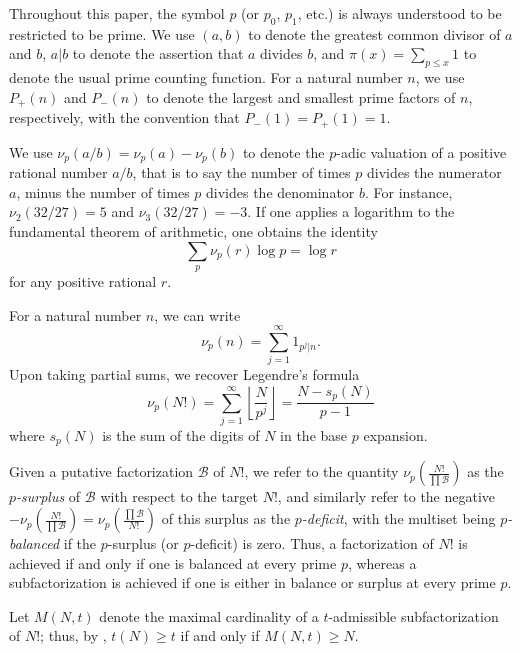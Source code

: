 \documentclass[12pt,a4paper,reqno]{amsart}
\numberwithin{equation}{section}
\theoremstyle{plain}
\theoremstyle{definition}
\newcommand\tuple{{\mathcal B}}
\begin{document}
Throughout this paper, the symbol $p$ (or $p_0$, $p_1$, etc.) is always understood to be restricted to be prime.  
We use $(a,b)$ to denote the greatest common divisor of $a$ and $b$, $a|b$ to denote the assertion that $a$ divides $b$, and $\pi(x) = \sum_{p \leq x} 1$ to denote the usual prime counting function.  For a natural number $n$, we use $P_+(n)$ and $P_-(n)$ to denote the largest and smallest prime factors of $n$, respectively, with the convention that $P_-(1) = P_+(1) = 1$. 

We use $\nu_p(a/b) = \nu_p(a)-\nu_p(b)$ to denote the $p$-adic valuation of a positive rational number $a/b$, that is to say the number of times $p$ divides the numerator $a$, minus the number of times $p$ divides the denominator $b$.  For instance, $\nu_2(32/27)=5$ and $\nu_3(32/27)=-3$.
If one applies a logarithm to the fundamental theorem of arithmetic, one obtains the identity
\begin{equation}\label{ftoa}
  \sum_p \nu_p(r) \log p = \log r
\end{equation}
for any positive rational $r$.  

For a natural number $n$, we can write
\begin{equation}\label{nup-form} 
  \nu_p(n) = \sum_{j=1}^\infty 1_{p^j|n}.
\end{equation}
Upon taking partial sums, we recover Legendre's formula
\begin{equation}\label{legendre}
  \nu_p(N!) = \sum_{j=1}^\infty \left\lfloor \frac{N}{p^j} \right\rfloor = \frac{N - s_p(N)}{p-1}
\end{equation}
where $s_p(N)$ is the sum of the digits of $N$ in the base $p$ expansion.

Given a putative factorization $\tuple$ of $N!$,  
we refer to the quantity $\nu_p\left( \frac{N!}{\prod \tuple} \right)$ as the \emph{$p$-surplus} of $\tuple$ with respect to the target $N!$, and similarly refer to the negative $-\nu_p\left( \frac{N!}{\prod \tuple} \right) = \nu_p\left( \frac{\prod \tuple}{N!} \right)$ of this surplus as the \emph{$p$-deficit}, with the multiset being \emph{$p$-balanced} if the $p$-surplus (or $p$-deficit) is zero.  Thus, a factorization of $N!$ is achieved if and only if one is balanced at every prime $p$, whereas a subfactorization is achieved if one is either in balance or surplus at every prime $p$.

Let $M(N,t)$ denote the maximal cardinality of a $t$-admissible subfactorization of $N!$; thus, by , $t(N) \geq t$ if and only if $M(N,t) \geq N$. 
\end{document}
